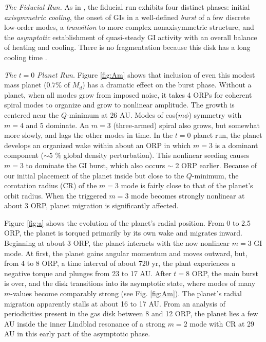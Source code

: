 \documentclass[12pt,manuscript,authoryear]{aastex}
\begin{document}
{\it The Fiducial Run.} As in \citet{mejia2005}, the fiducial run exhibits four distinct phases: initial {\sl
  axisymmetric cooling}, the onset of GIs in a well-defined {\sl burst} of a few discrete low-order modes, a {\sl
  transition} to more complex nonaxisymmetric structure, and the {\sl asymptotic} establishment of quasi-steady GI
activity with an overall balance of heating and cooling. There is no fragmentation because this disk has a long cooling
time \citep{gammie2001,boley2006,boley2007b}.

{\it The $t = 0$ Planet Run.} Figure \ref{fig:Am} shows that inclusion of even this modest mass planet ($0.7 \%$ of
$M_d$) has a dramatic effect on the burst phase. Without a planet, when all modes grow from imposed noise, it takes 4
ORPs for coherent spiral modes to organize and grow to nonlinear amplitude. The growth is centered near the $Q$-minimum
at $26$ AU. Modes of cos($m\phi$) symmetry with $m = 4$ and 5 dominate. An $m = 3$ (three-armed) spiral also grows, but
somewhat more slowly, and lags the other modes in time. In the $t = 0$ planet run, the planet develops an organized wake
within about an ORP in which $m = 3$ is a dominant component ($\sim 5$ \% global density perturbation). This nonlinear
seeding causes $m = 3$ to dominate the GI burst, which also occurs $\sim$ 2 ORP earlier. Because of our initial
placement of the planet inside but close to the $Q$-minimum, the corotation radius (CR) of the $m = 3$ mode is fairly
close to that of the planet's orbit radius. When the triggered $m = 3$ mode becomes strongly nonlinear at about 3 ORP,
planet migration is significantly affected.

Figure \ref{fig:a} shows the evolution of the planet's radial position. From 0 to 2.5 ORP, the planet is torqued
primarily by its own wake and migrates inward.  Beginning at about 3 ORP, the planet interacts with the now nonlinear $m
= 3$ GI mode. At first, the planet gains angular momentum and moves outward, but, from 4 to 8 ORP, a time interval of
about 720 yr, the plant experiences a negative torque and plunges from 23 to 17 AU.  After $t = 8$ ORP, the main burst
is over, and the disk transitions into its asymptotic state, where modes of many $m$-values become comparably strong
(see Fig. \ref{fig:Am}). The planet's radial migration apparently stalls at about 16 to 17 AU. From an analysis of
periodicities present in the gas disk between 8 and 12 ORP, the planet lies a few AU inside the inner Lindblad resonance
of a strong $m = 2$ mode with CR at 29 AU in this early part of the asymptotic phase.
\end{document}
